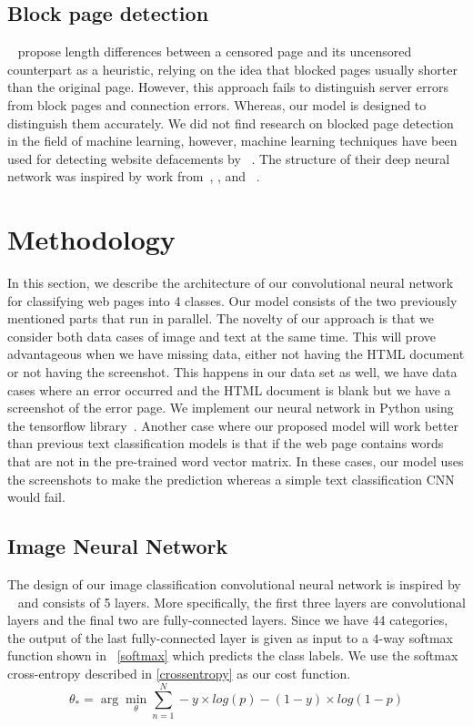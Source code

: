 \documentclass{article} %
\newcommand{\argmin}{\arg\!\min}
\begin{document}
\subsection{Block page detection}
~\parencite{imc14_phillipa} propose length differences between a censored page and its uncensored counterpart as a heuristic, 
relying on the idea that blocked pages usually shorter than the original page. However, this approach fails to distinguish server errors from block pages and connection errors. Whereas, our model is designed to distinguish them accurately.
We did not find research on blocked page detection in the field of machine learning, however, machine learning techniques have been used for detecting website defacements by ~\parencite{meerkat}. The structure of their deep neural network was inspired by work from~\parencite{imagehinton}, \parencite{nipsandrewng}, and ~\parencite{icml_unsupervised}.

\section{Methodology}
In this section, we describe the architecture of our convolutional neural network for classifying web pages into 4 classes. Our model consists of the two previously mentioned parts that run in parallel. The novelty of our approach is that we consider both data cases of image and text at the same time. This will prove advantageous when we have missing data, either not having the HTML document or not having the screenshot. This happens in our data set as well, we have data cases where an error occurred and the HTML document is blank but we have a screenshot of the error page. We implement our neural network in Python using the tensorflow library~\cite{tensorflow2015}. Another case where our proposed model will work better than previous text classification models is that if the web page contains words that are not in the pre-trained word vector matrix. In these cases, our model uses the screenshots to make the prediction whereas a simple text classification CNN would fail.

\subsection{Image Neural Network}
The design of our image classification convolutional neural network is inspired by ~\cite{imagehinton} and consists of 5 layers. More specifically, the first three layers are convolutional layers and the final two are fully-connected layers. Since we have 44 categories, the output of the last fully-connected layer is given as input to a $4$-way softmax function shown in ~\ref{softmax} which predicts the class labels. We use the softmax cross-entropy described in \ref{crossentropy} as our cost function.
\begin{equation} \label{crossentropy}
\theta_{*} = \argmin_\theta \sum_{n=1} ^{N} -y \times log(p)-(1-y)\times log(1-p)
\end{equation}
\end{document}
